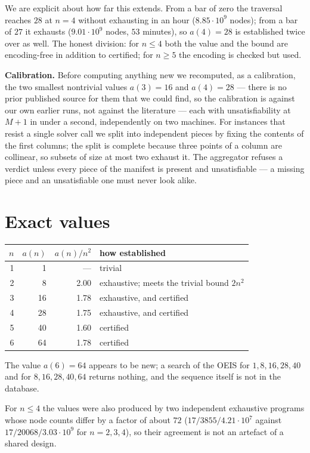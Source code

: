 \documentclass[11pt,a4paper]{article}
\begin{document}
We are explicit about how far this extends.  From a bar of zero the traversal reaches $28$ at $n=4$ without
exhausting in an hour ($8.85\cdot10^9$ nodes); from a bar of $27$ it exhausts ($9.01\cdot10^9$ nodes, $53$
minutes), so $a(4)=28$ is established twice over as well.  The honest division: for $n\le4$ both the value and
the bound are encoding-free in addition to certified; for $n\ge5$ the encoding is checked but used.

\medskip\noindent\textbf{Calibration.}  Before computing anything new we recomputed, as a calibration, the two
smallest nontrivial values $a(3)=16$ and $a(4)=28$ --- there is no prior published source for them that we could
find, so the calibration is against our own earlier runs, not against the literature --- each with unsatisfiability
at $M+1$ in under a second, independently on two machines.
For instances that resist a single solver call we split into independent pieces by fixing the contents of the
first columns; the split is complete because three points of a column are collinear, so subsets of size at most
two exhaust it.  The aggregator refuses a verdict unless every piece of the manifest is present and
unsatisfiable --- a missing piece and an unsatisfiable one must never look alike.

\section{Exact values}
\begin{center}\begin{tabular}{rrrl}\toprule
$n$ & $a(n)$ & $a(n)/n^2$ & how established\\\midrule
1 & 1 & --- & trivial\\
2 & 8 & 2.00 & exhaustive; meets the trivial bound $2n^2$\\
3 & 16 & 1.78 & exhaustive, and certified\\
4 & 28 & 1.75 & exhaustive, and certified\\
5 & 40 & 1.60 & certified\\
6 & 64 & 1.78 & certified\\\bottomrule
\end{tabular}\end{center}
\noindent The value $a(6)=64$ appears to be new; a search of the OEIS for $1,8,16,28,40$ and for
$8,16,28,40,64$ returns nothing, and the sequence itself is not in the database.

For $n\le4$ the values were also produced by two independent exhaustive programs whose node counts differ by
a factor of about $72$ ($17/3855/4.21\cdot10^7$ against $17/20068/3.03\cdot10^9$ for $n=2,3,4$), so their
agreement is not an artefact of a shared design.
\end{document}
